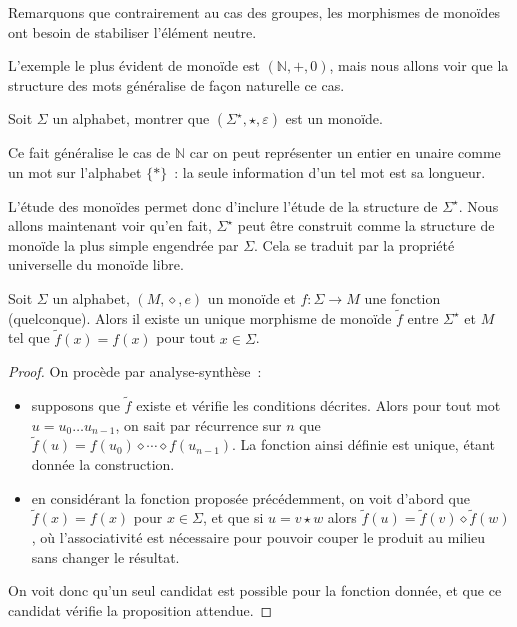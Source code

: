 Remarquons que contrairement au cas des groupes, les morphismes de monoïdes ont
besoin de stabiliser l'élément neutre.

L'exemple le plus évident de monoïde est $(\mathbb N,+,0)$, mais nous allons
voir que la structure des mots généralise de façon naturelle ce cas.

\begin{exercise}
  Soit $\Sigma$ un alphabet, montrer que $(\Sigma^\star, \star,\varepsilon)$ est
  un monoïde.
\end{exercise}

Ce fait généralise le cas de $\mathbb N$ car on peut représenter un entier en
unaire comme un mot sur l'alphabet $\{*\}$~: la seule information d'un tel mot
est sa longueur.

L'étude des monoïdes permet donc d'inclure l'étude de la structure de
$\Sigma^\star$. Nous allons maintenant voir qu'en fait, $\Sigma^\star$ peut être
construit comme la structure de monoïde la plus simple engendrée par $\Sigma$.
Cela se traduit par la propriété universelle du monoïde libre.

\begin{theorem}\label{thm.PU.monoid}
  Soit $\Sigma$ un alphabet, $(M,\diamond,e)$ un monoïde et $f : \Sigma \to M$
  une fonction (quelconque). Alors il existe un unique morphisme de monoïde
  $\tilde f$ entre $\Sigma^\star$ et $M$ tel que $\tilde f (x) = f(x)$ pour tout
  $x \in \Sigma$.
\end{theorem}

\begin{proof}
  On procède par analyse-synthèse~:
  \begin{itemize}
  \item supposons que $\tilde f$ existe et vérifie les conditions décrites.
    Alors pour tout mot $u = u_0\ldots u_{n-1}$, on sait par récurrence sur
    $n$ que $\tilde f(u) = f(u_0)\diamond \cdots \diamond f(u_{n-1})$. La
    fonction ainsi définie est unique, étant donnée la construction.
  \item en considérant la fonction proposée précédemment, on voit d'abord que
    $\tilde f(x) = f(x)$ pour $x\in \Sigma$, et que si $u = v\star w$ alors
    $\tilde f(u) = \tilde f(v)\diamond \tilde f(w)$, où l'associativité est
    nécessaire pour pouvoir couper le produit au milieu sans changer le
    résultat.
  \end{itemize}
  On voit donc qu'un seul candidat est possible pour la fonction donnée, et que
  ce candidat vérifie la proposition attendue.
\end{proof}

